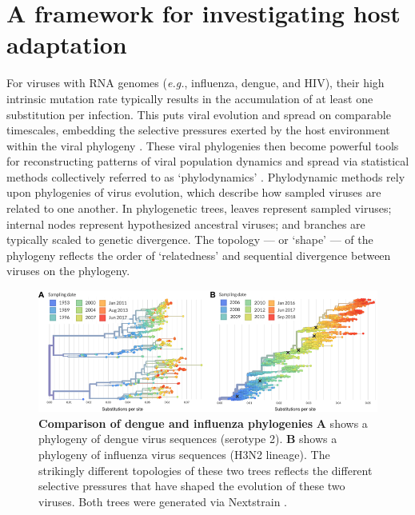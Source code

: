\section{A framework for investigating host adaptation}
For viruses with RNA genomes (\textit{e.g.}, influenza, dengue, and HIV), their high intrinsic mutation rate typically results in the accumulation of at least one  substitution per infection.
This puts viral evolution and spread on comparable timescales, embedding the selective pressures exerted by the host environment within the viral phylogeny \citep{bedford2011strength}.
These viral phylogenies then become powerful tools for reconstructing patterns of viral population dynamics and spread via statistical methods collectively referred to as `phylodynamics' \citep{grenfell2004unifying}.
Phylodynamic methods rely upon phylogenies of virus evolution, which describe how sampled viruses are related to one another.
In phylogenetic trees, leaves represent sampled viruses; internal nodes represent hypothesized ancestral viruses; and branches are typically scaled to genetic divergence.
The topology --- or `shape' --- of the phylogeny reflects the order of `relatedness' and sequential divergence between viruses on the phylogeny.

\begin{figure}[ht!]
  \begin{centering}
    \includegraphics[width=\linewidth]{./png/dengue_vs_influenza.png}
  	\caption[Comparison of dengue and influenza phylogenies]{\textbf{Comparison of dengue and influenza phylogenies }
\textbf{A} shows a phylogeny of dengue virus sequences (serotype 2).
\textbf{B} shows a phylogeny of influenza virus sequences (H3N2 lineage).
The strikingly different topologies of these two trees reflects the different selective pressures that have shaped the evolution of these two viruses.
Both trees were generated via Nextstrain \citep{hadfield2017nextstrain}.
}
  	\label{dengue_vs_influenza}
  \end{centering}
\end{figure}

